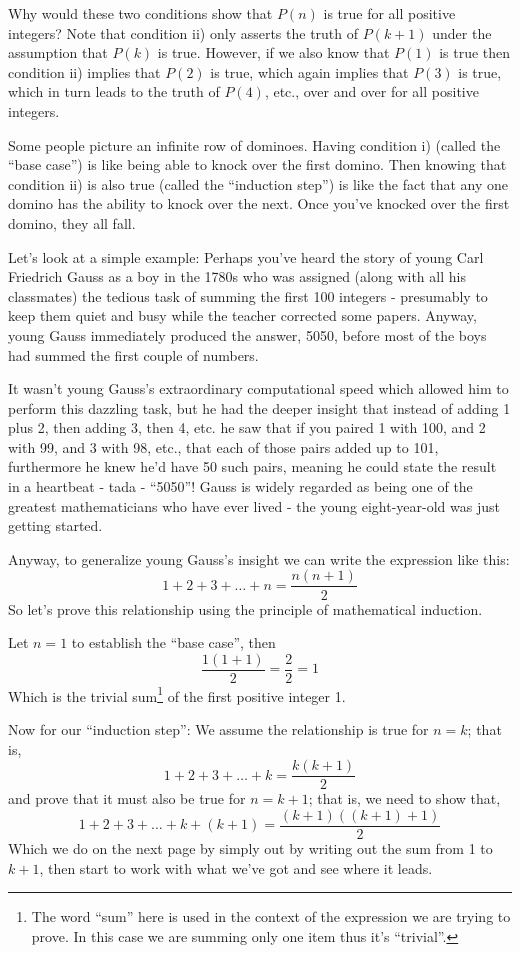 \documentclass{article}
\begin{document}
Why would these two conditions show that $P(n)$ is true for all
positive integers? Note that condition ii) only asserts the truth
of $P(k+1)$ under the assumption that $P(k)$ is true.
However, if we also know that $P(1)$ is true then condition ii) implies that $P(2)$ is true,
which again implies that $P(3)$ is true,
which in turn leads to the truth of $P(4)$,
etc., over and over for all positive integers.

Some people picture an infinite row of dominoes.
Having condition i) (called the ``base case'') is like being
able to knock over the first domino.
Then knowing that condition ii) is also true (called the ``induction step'') is like the
fact that any one domino has the ability to knock over the next.
Once you've knocked over the first domino,
they all fall.

Let's look at a simple example:
Perhaps you've heard the story of young Carl Friedrich Gauss
as a boy in
the 1780s who was assigned (along with all his classmates)
the tedious task of summing the first 100 integers -
presumably to keep them quiet and busy while the
teacher corrected some papers. Anyway,
young Gauss immediately produced the answer,
5050, before most of the boys had summed the first couple of numbers.

It wasn't young Gauss's extraordinary computational speed which allowed
him to perform this dazzling task,
but he had the deeper insight that instead of adding 1 plus 2,
then adding 3, then 4, etc.
he saw that if you paired 1 with 100,
and 2 with 99,
and 3 with 98,
etc.,
that each of those pairs added up to 101,
furthermore he knew he'd have 50 such pairs,
meaning he could state the result in a heartbeat - tada - ``5050''!
Gauss is widely regarded as being one of the greatest
mathematicians who have ever lived - the young eight-year-old was just getting started.

Anyway,
to generalize young Gauss's insight we can write the expression like this:
\[1+2+3+\ldots+n=\frac{n(n+1)}{2}\]
So let's prove this relationship using the principle of mathematical induction.
\bigskip

Let $n=1$ to establish the ``base case'',
then
\[\frac{1(1+1)}{2}=\frac{2}{2}=1\]
Which is the trivial sum\footnote{The word ``sum'' here is used
in the context of the expression
we are trying to prove. In this case we are summing
only one item thus it's ``trivial''.} of the first positive integer 1.

Now for our ``induction step'': We assume the relationship is true for $n=k$; that is,
\[1+2+3+\ldots+k=\frac{k(k+1)}{2}\]
and prove that it must also be true
for $n=k+1$; that is, we need to show that,
\[1+2+3+\ldots+k+(k+1)=\frac{(k+1)((k+1)+1)}{2}\]
Which we do on the next page by simply out by writing out the sum from 1 to \(k+1\), then
start to work with what we've got and see where it leads.
\end{document}
